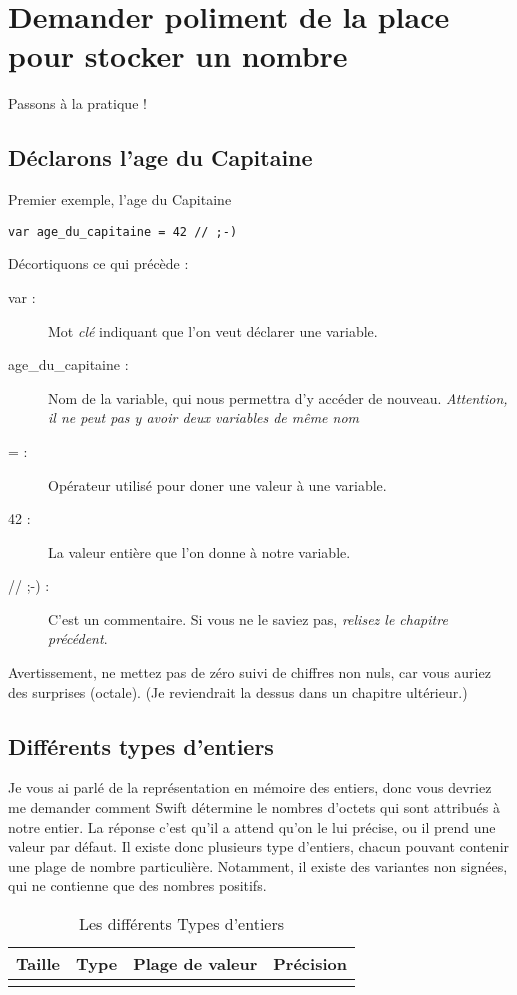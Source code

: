\section{Demander poliment de la place pour stocker un nombre}
Passons à la pratique !
\subsection{Déclarons l'age du Capitaine}
\begin{listing}[h]
\caption{Premier exemple, l'age du Capitaine}
\begin{verbatim}
var age_du_capitaine = 42 // ;-)
\end{verbatim}
\end{listing}
Décortiquons ce qui précède :
\begin{description}
\item[var :] Mot \emph{clé} indiquant que l'on veut déclarer une variable.
\item[age\_du\_capitaine :] Nom de la variable, qui nous permettra d'y accéder de nouveau. \emph{Attention, il ne peut pas y avoir deux variables de même nom}
\item[= :] Opérateur utilisé pour doner une valeur à une variable.
\item[42 :] La valeur entière que l'on donne à notre variable.
\item[// ;-) :] C'est un commentaire. Si vous ne le saviez pas, \emph{relisez le chapitre précédent}.
\end{description}
Avertissement, ne mettez pas de zéro suivi de chiffres non nuls, car vous auriez des surprises (octale). (Je reviendrait la dessus dans un chapitre ultérieur.)
\subsection{Différents types d'entiers}
Je vous ai parlé de la représentation en mémoire des entiers, donc vous devriez me demander comment Swift détermine le nombres d'octets qui sont attribués à notre entier. La réponse c'est qu'il a attend qu'on  le lui précise, ou il prend une valeur par défaut.
Il existe donc plusieurs type d'entiers, chacun pouvant contenir une plage de nombre particulière. Notamment, il existe des variantes non signées, qui ne contienne que des nombres positifs.

\begin{longtabu} to \linewidth {|X[3,l,m]|X[1.5,l,m]|X[6,r,m]|X[1,r,m]|}
\hline Taille & Type & Plage de valeur & Précision \\ \hline
\endhead

\caption{Les différents Types d'entiers}
\end{longtabu}

